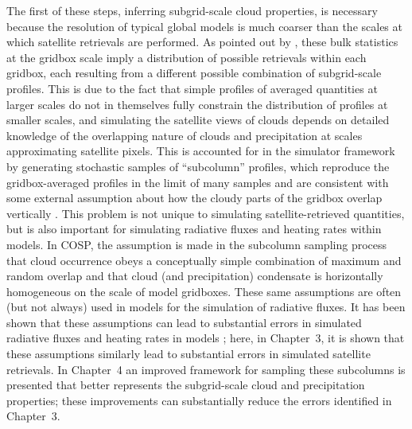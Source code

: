 The first of these steps, inferring subgrid-scale cloud properties, is
necessary because the resolution of typical global models is much
coarser than the scales at which satellite retrievals are performed. As
pointed out by \citet{pincus_et_al_2012}, these bulk statistics at the
gridbox scale imply a distribution of possible retrievals within each
gridbox, each resulting from a different possible combination of
subgrid-scale profiles. This is due to the fact that simple profiles of
averaged quantities at larger scales do not in themselves fully
constrain the distribution of profiles at smaller scales, and simulating
the satellite views of clouds depends on detailed knowledge of the
overlapping nature of clouds and precipitation at scales approximating
satellite pixels. This is accounted for in the simulator framework by
generating stochastic samples of ``subcolumn'' profiles, which reproduce
the gridbox-averaged profiles in the limit of many samples and are
consistent with some external assumption about how the cloudy parts of
the gridbox overlap vertically \citep{klein_and_jakob_1999}. This
problem is not unique to simulating satellite-retrieved quantities, but
is also important for simulating radiative fluxes and heating rates
within models. In COSP, the assumption is made in the subcolumn sampling
process that cloud occurrence obeys a conceptually simple combination of
maximum and random overlap and that cloud (and precipitation) condensate
is horizontally homogeneous on the scale of model gridboxes. These same
assumptions are often (but not always) used in models for the simulation
of radiative fluxes. It has been shown that these assumptions can lead
to substantial errors in simulated radiative fluxes and heating rates in
models \citep{barker_et_al_1999, oreopoulos_et_al_2012}; here, in
Chapter~3, it is shown that these assumptions similarly lead to
substantial errors in simulated satellite retrievals. In Chapter~4 an
improved framework for sampling these subcolumns is presented that
better represents the subgrid-scale cloud and precipitation properties;
these improvements can substantially reduce the errors identified in
Chapter~3.

